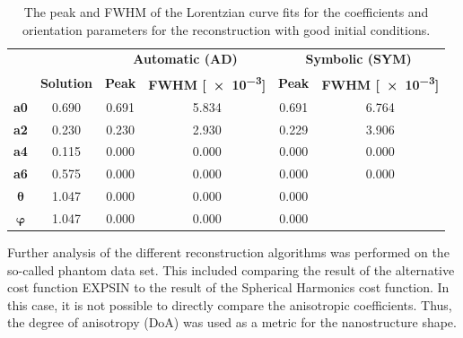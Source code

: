 \begin{table}[h!]
    \centering
    \caption{  The peak and FWHM of the Lorentzian curve fits
        for the coefficients and orientation parameters for the reconstruction
        with good initial conditions.}
    \label{tab:curve_fitting}
    \begin{tabular}{ c c c c c c }
        \hline %
        \textbf{}      &                   & \multicolumn{2}{c}{\textbf{Automatic (AD)}} & \multicolumn{2}{c}{\textbf{Symbolic (SYM)}}                                             \\
        \textbf{}      & \textbf{Solution} & \textbf{Peak}                               & \textbf{FWHM [\num{e-3}]}                   & \textbf{Peak} & \textbf{FWHM [\num{e-3}]} \\
        \hline %
        \textbf{a0}    & 0.690             & 0.691                                       & 5.834                                       & 0.691         & 6.764                     \\
        \textbf{a2}    & 0.230             & 0.230                                       & 2.930                                       & 0.229         & 3.906                     \\
        \textbf{a4}    & 0.115             & 0.000                                       & 0.000                                       & 0.000         & 0.000                     \\
        \textbf{a6}    & 0.575             & 0.000                                       & 0.000                                       & 0.000         & 0.000                     \\
        $\bm{\theta}$  & 1.047             & 0.000                                       & 0.000                                       & 0.000                                     \\
        $\bm{\varphi}$ & 1.047             & 0.000                                       & 0.000                                       & 0.000                                     \\
        \hline %
    \end{tabular}
\end{table}

\clearpage

Further analysis of the different reconstruction algorithms was performed on the so-called phantom data set.
This included comparing the result of the alternative cost function EXPSIN to the result of the Spherical Harmonics cost function.
In this case, it is not possible to directly compare the anisotropic coefficients. Thus, the degree of anisotropy (DoA) was used as a metric for the nanostructure shape.

